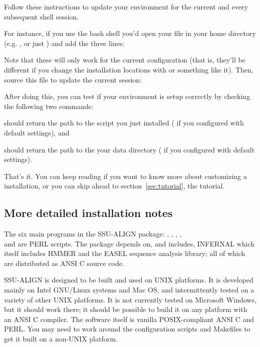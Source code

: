Follow these instructions to update your environment for the current
and every subsequent shell session.

For instance, if you use the bash shell you'd 
open your  file in your home directory (e.g.
, or just ) and add the
three lines: 




Note that these will only work for the current configuration (that is,
they'll be different if you change the installation locations with
 or something like it). Then, source this file to
update the current session:


After doing this, you can test if your environment is setup correctly
by checking the following two commands: 


should return the path to the  script you
just installed ( if you configured
with default settings), and


should return the path to the your data directory
( if you configured with default
settings).

That's it. You can keep reading if you want to know more about
customizing a  installation, or you can skip ahead to
section~\ref{sec:tutorial}, the tutorial.

\subsection{More detailed installation notes}

The six main programs in the SSU-ALIGN package:
, , , ,\\
 and  are PERL scripts. The
package depends on, and includes, INFERNAL 
which itself includes HMMER and the EASEL sequence analysis
library; all of which are distributed as ANSI C source code. 

SSU-ALIGN is designed to be built and used on UNIX platforms. It
is developed mainly on Intel GNU/Linux systems and Mac OS, and
intermittently tested on a variety of other UNIX platforms. It is not
currently tested on Microsoft Windows, but it should work there; it
should be possible to build it on any platform with an ANSI C
compiler. The software itself is vanilla POSIX-compliant ANSI C and
PERL. You may need to work around the configuration scripts and
Makefiles to get it built on a non-UNIX platform.

